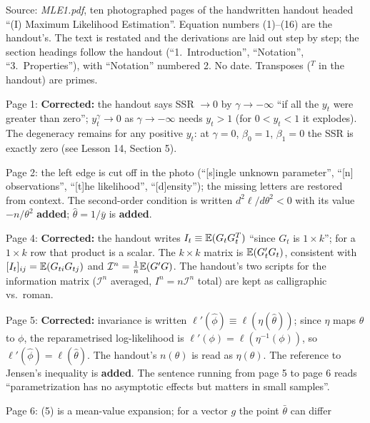 \documentclass[11pt]{article}
\begin{document}
\clearpage
\begin{transcriptnotes}
 \item Source: \emph{MLE1.pdf}, ten photographed pages of the handwritten handout headed
       ``(I) Maximum Likelihood Estimation''. Equation numbers (1)--(16) are the handout's.
       The text is restated and the derivations are laid out step by step; the section
       headings follow the handout (``1.~Introduction'', ``Notation'', ``3.~Properties''),
       with ``Notation'' numbered 2. No date. Transposes ($^{T}$ in the handout) are primes.
 \item Page 1: \textbf{Corrected:} the handout says SSR $\to0$ by $\gamma\to-\infty$ ``if all the $y_{t}$
       were greater than zero''; $y_{t}^{\gamma}\to0$ as $\gamma\to-\infty$ needs $y_{t}>1$ (for
       $0<y_{t}<1$ it explodes). The degeneracy remains for any positive $y_{t}$: at $\gamma=0$,
       $\beta_{0}=1$, $\beta_{1}=0$ the SSR is exactly zero (see Lesson 14, Section 5).
 \item Page 2: the left edge is cut off in the photo (``[s]ingle unknown parameter'',
       ``[n] observations'', ``[t]he likelihood'', ``[d]ensity''); the missing letters are
       restored from context. The second-order condition is written $d^{2}\ell/d\theta^{2}<0$ with
       its value $-n/\theta^{2}$ \textbf{added}; $\hat\theta=1/\bar y$ is \textbf{added}.
 \item Page 4: \textbf{Corrected:} the handout writes $I_{t}\equiv\mathbb{E}(G_{t}G_{t}^{T})$ ``since $G_{t}$ is
       $1\times k$''; for a $1\times k$ row that product is a scalar. The $k\times k$ matrix is
       $\mathbb{E}(G_{t}'G_{t})$, consistent with $[I_{t}]_{ij}=\mathbb{E}(G_{ti}G_{tj})$ and $\mathcal I^{n}=\frac1n\mathbb{E}(G'G)$.
       The handout's two scripts for the information matrix ($\mathcal I^{n}$ averaged,
       $I^{n}=n\mathcal I^{n}$ total) are kept as calligraphic vs.\ roman.
 \item Page 5: \textbf{Corrected:} invariance is written
       $\ell'(\hat\phi)\equiv\ell(\eta(\hat\theta))$; since $\eta$ maps $\theta$ to $\phi$, the
       reparametrised log-likelihood is $\ell'(\phi)=\ell(\eta^{-1}(\phi))$, so
       $\ell'(\hat\phi)=\ell(\hat\theta)$. The handout's $n(\theta)$ is read as $\eta(\theta)$. The
       reference to Jensen's inequality is \textbf{added}. The sentence running from page 5
       to page 6 reads ``parametrization has no asymptotic effects but matters in small samples''.
 \item Page 6: (5) is a mean-value expansion; for a vector $g$ the point $\bar\theta$ can differ

\end{transcriptnotes}
\end{document}
